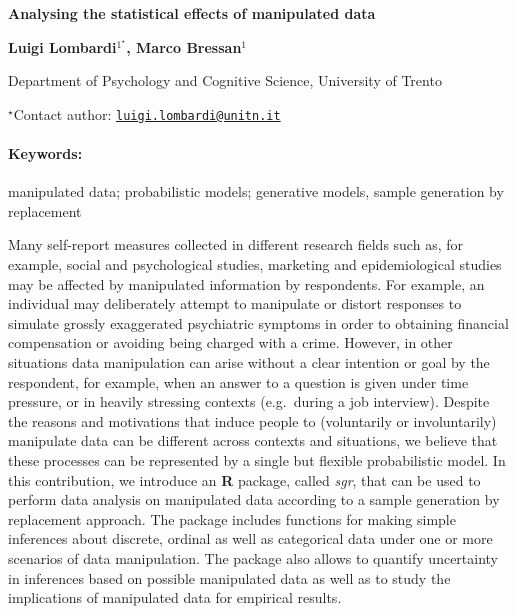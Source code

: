 \documentclass[11pt, a4paper]{article}
\renewcommand{\title}[1]{\begin{center}{\bf \LARGE #1}\end{center}}
\newcommand{\keywords}{\paragraph{Keywords:}}
\begin{document}
\pagestyle{empty}

\title{Analysing the statistical effects of manipulated data}

\begin{center}
  {\bf Luigi Lombardi$^{1^\star}$, Marco Bressan$^{1}$}
\end{center}

\vskip 0.3cm

\begin{affiliations}
\begin{enumerate}
\begin{minipage}{0.915\textwidth}
\centering
\item Department of Psychology and Cognitive Science, University of Trento \\[-2pt]
\end{minipage}
\end{enumerate}
$^\star$Contact author: \href{mailto:luigi.lombardi@unitn.it}{\nolinkurl{luigi.lombardi@unitn.it}}\\
\end{affiliations}

\vskip 0.5cm

\begin{minipage}{0.915\textwidth}
\keywords manipulated data; probabilistic models; generative models, sample
generation by replacement
\end{minipage}

\vskip 0.8cm

Many self-report measures collected in different research fields such
as, for example, social and psychological studies, marketing and
epidemiological studies may be affected by manipulated information by
respondents. For example, an individual may deliberately attempt to
manipulate or distort responses to simulate grossly exaggerated
psychiatric symptoms in order to obtaining financial compensation or
avoiding being charged with a crime. However, in other situations data
manipulation can arise without a clear intention or goal by the
respondent, for example, when an answer to a question is given under
time pressure, or in heavily stressing contexts (e.g.~during a job
interview). Despite the reasons and motivations that induce people to
(voluntarily or involuntarily) manipulate data can be different across
contexts and situations, we believe that these processes can be
represented by a single but flexible probabilistic model. In this
contribution, we introduce an \textbf{R} package, called \emph{sgr},
that can be used to perform data analysis on manipulated data according
to a sample generation by replacement approach. The package includes
functions for making simple inferences about discrete, ordinal as well
as categorical data under one or more scenarios of data manipulation.
The package also allows to quantify uncertainty in inferences based on
possible manipulated data as well as to study the implications of
manipulated data for empirical results.
\end{document}
